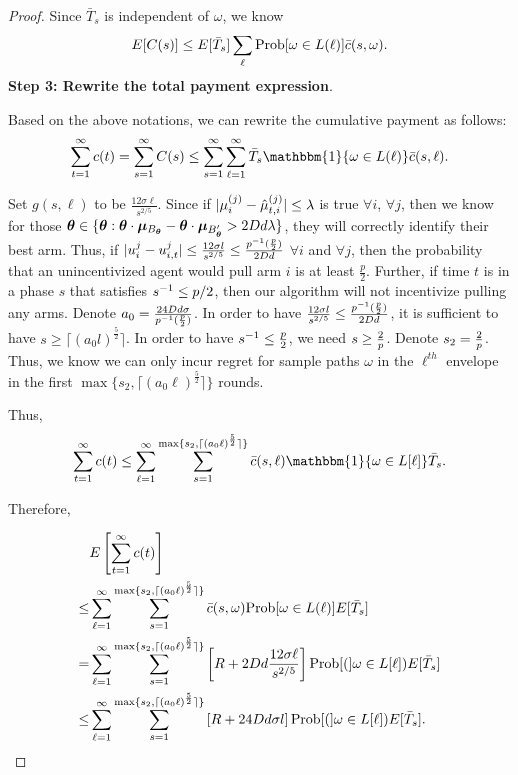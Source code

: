 \begin{proof}
Since $\bar{T}_{s}$ is independent of $\omega$, we know
\begin{align}
E[C(s)]\leq E[\bar{T}_{s}]\sum_{\ell}\Prob{\omega\in L(\ell)}\bar{c}(s,\omega). \nonumber
\end{align}
\noindent\textbf{Step 3: Rewrite the total payment expression}.

Based on the above notations, we can rewrite the cumulative payment as follows:
\begin{align}
\sum_{t=1}^{\infty}c(t) =\sum_{s=1}^{\infty}C(s)
\leq  \sum_{s=1}^{\infty}\sum_{\ell=1}^{\infty}\bar{T}_{s}\mathbbm{1}\{\omega\in L(\ell)\}\bar{c}(s,\ell). \nonumber
\end{align}

Set $g(s,\ell)$ to be $\frac{12\sigma \ell}{s^{2/5}}$. Since if $|\mu_{i}^{(j)}-\hat{\mu}_{t,i}^{(j)}|\leq \lambda$ is true $\forall i$, $\forall j$, then we know for those $\bm{\theta}\in \{\bm{\theta}:\bm{\theta}\cdot \bm{\mu}_{B_{\bm{\theta}}}-\bm{\theta} \cdot \bm{\mu}_{B'_{\bm{\theta}}}> 2D d\lambda\}$, they will correctly identify their best arm. Thus, if $|u_{i}^{j}-u_{i,t}^{j}|\leq \frac{12\sigma l}{s^{2/5}} \leq \frac{p^{-1}(\frac{p}{2})}{2D d}$ $\forall i$ and $\forall j$, then the probability that an unincentivized agent would pull arm $i$ is at least $\frac{p}{2}$. Further, if time $t$ is in a phase $s$ that satisfies $s^{-1}\leq p/2$, then our algorithm will not incentivize pulling any arms. Denote $a_0=\frac{24D d\sigma}{p^{-1}(\frac{p}{2})}$. In order to have $\frac{12\sigma l}{s^{2/5}}\leq \frac{p^{-1}(\frac{p}{2})}{2D d}$, it is sufficient to have $s\geq \lceil (a_{0} l)^\frac{5}{2} \rceil$. In order to have $s^{-1}\leq \frac{p}{2}$, we need $s\geq \frac{2}{p}$. Denote $s_2=\frac{2}{p}$. Thus, we know we can only incur regret for sample paths $\omega$ in the $\ell^{th}$ envelope in the first $\max\{s_2,\lceil (a_0 \ell)^\frac{5}{2} \rceil\}$ rounds.

Thus,
\begin{align}
\sum_{t=1}^{\infty}c(t)\leq\sum_{\ell=1}^{\infty}\sum_{s=1}^{\max\{s_2,\lceil (a_0 \ell)^\frac{5}{2} \rceil\}}\bar{c}(s,\ell)\mathbbm{1}\{\omega\in L[\ell]\}\bar{T}_{s}. \nonumber
\end{align}

Therefore,

\begin{align}
&E\left[\sum_{t=1}^{\infty}c(t)\right] \nonumber\\
\leq &\sum_{\ell=1}^{\infty}\sum_{s=1}^{\max\{s_2,\lceil (a_0 \ell)^\frac{5}{2} \rceil\}}\bar{c}(s,\omega)\Prob{\omega \in L(\ell)}E[\bar{T}_{s}] \nonumber \\
=&\sum_{\ell=1}^{\infty}\sum_{s=1}^{\max\{s_2,\lceil (a_0 \ell)^\frac{5}{2} \rceil\}}\left[\MAXR+2\Diam d\frac{12\sigma \ell}{s^{2/5}}\right]\Prob(\omega\in L[\ell])E[\bar{T}_{s}] \nonumber \\
\leq &\sum_{\ell=1}^{\infty}\sum_{s=1}^{\max\{s_2,\lceil (a_0 \ell)^\frac{5}{2} \rceil\}}\left[\MAXR+24\Diam d\sigma l\right]\Prob(\omega\in L[\ell])E[\bar{T}_{s}]. \nonumber
\end{align}


\end{proof}
